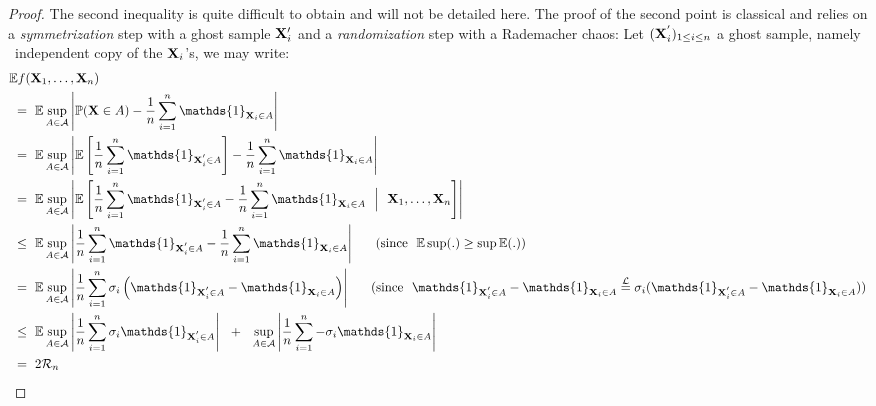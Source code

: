 \begin{proof}
The second inequality is quite difficult to obtain and will not be detailed here. %
The proof of the second point is classical and relies on a \emph{symmetrization} step with a ghost sample $\mathbf X_i'$ and a \emph{randomization} step with a Rademacher chaos:
Let $(\mathbf X_i^{'})_{1 \le i \le n}$ a ghost sample, namely \iid~independent copy of the $\mathbf X_i$'s, we may write:
\begin{align*}
&\mathbb{E} f(\mb X_1,\ldots,\mb X_n) \\
&~=~ \mathbb{E} \sup_{A \in \mathcal{A}} \left | \mathbb{P}(\mb X \in A) - \frac{1}{n} \sum_{i=1}^{n}\mathds{1}_{\mb X_i \in A} \right| \\
&~=~ \mathbb{E} \sup_{A \in \mathcal{A}} \left | \mathbb{E}\left [ \frac{1}{n} \sum_{i=1}^{n}\mathds{1}_{\mb X_i^{'} \in A}\right] - \frac{1}{n} \sum_{i=1}^{n}\mathds{1}_{\mb X_i \in A} \right|\\
&~=~ \mathbb{E} \sup_{A \in \mathcal{A}} \left | \mathbb{E}\left [ \frac{1}{n} \sum_{i=1}^{n}\mathds{1}_{\mb X_i^{'} \in A} - \frac{1}{n} \sum_{i=1}^{n}\mathds{1}_{\mb X_i \in A} ~~\Big|~~ \mb X_1,\ldots,\mb X_n \right]\right|\\
&~\le~ \mathbb{E} \sup_{A \in \mathcal{A}} \left | \frac{1}{n} \sum_{i=1}^{n}\mathds{1}_{\mb X_i^{'} \in A} - \frac{1}{n} \sum_{i=1}^{n}\mathds{1}_{\mb X_i \in A} \right| ~~~~~(\text{since~~} \mathbb{E} \sup(.) \ge \sup \mathbb{E}(.) ) \\ 
&~=~ \mathbb{E} \sup_{A \in \mathcal{A}} \left |\frac{1}{n} \sum_{i=1}^{n} \sigma_i \left ( \mathds{1}_{\mb X_i^{'} \in A} - \mathds{1}_{\mb X_i \in A} \right) \right| ~~~~~(\text{since~~} \mathds{1}_{\mb X_i^{'} \in A} - \mathds{1}_{\mb X_i \in A} \overset{\mathcal{L}}{=} \sigma_i(\mathds{1}_{\mb X_i^{'} \in A} - \mathds{1}_{\mb X_i \in A}) )  \\
&~\le~\mathbb{E} \sup_{A \in \mathcal{A}} \left |\frac{1}{n} \sum_{i=1}^{n} \sigma_i \mathds{1}_{\mb X_i^{'} \in A}  \right| ~~+~~ \sup_{A \in \mathcal{A}} \left |\frac{1}{n} \sum_{i=1}^{n} -\sigma_i \mathds{1}_{\mb X_i \in A}  \right|\\
&~=~ 2 \mathcal{R}_n
\end{align*}
\end{proof}


